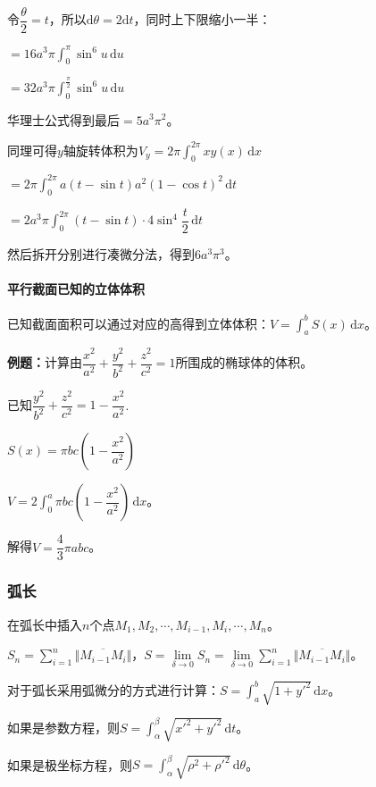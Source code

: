 \documentclass[UTF8, 12pt]{ctexart}
\begin{document}
令$\dfrac{\theta}{2}=t$，所以$\textrm{d}\theta=2\textrm{d}t$，同时上下限缩小一半：

$=16a^3\pi\int_0^\pi\sin^6u\,\textrm{d}u$

$=32a^3\pi\int_0^{\frac{\pi}{2}}\sin^6u\,\textrm{d}u$

华理士公式得到最后$=5a^3\pi^2$。

同理可得$y$轴旋转体积为$V_y=2\pi\int_0^{2\pi}xy(x)\,\textrm{d}x$

$=2\pi\int_0^{2\pi}a(t-\sin t)a^2(1-\cos t)^2\,\textrm{d}t$

$=2a^3\pi\int_0^{2\pi}(t-\sin t)\cdot 4\sin^4\dfrac{t}{2}\,\textrm{d}t$

然后拆开分别进行凑微分法，得到$6a^3\pi^3$。

\paragraph{平行截面已知的立体体积}  \leavevmode \medskip

已知截面面积可以通过对应的高得到立体体积：$V=\int_a^bS(x)\,\textrm{d}x$。

\textbf{例题：}计算由$\dfrac{x^2}{a^2}+\dfrac{y^2}{b^2}+\dfrac{z^2}{c^2}=1$所围成的椭球体的体积。

已知$\dfrac{y^2}{b^2}+\dfrac{z^2}{c^2}=1-\dfrac{x^2}{a^2}$.

$S(x)=\pi bc\left(1-\dfrac{x^2}{a^2}\right)$

$V=2\int_0^a\pi bc\left(1-\dfrac{x^2}{a^2}\right)\,\textrm{d}x$。

解得$V=\dfrac{4}{3}\pi abc$。

\subsubsection{弧长}

在弧长中插入$n$个点$M_1,M_2,\cdots,M_{i-1},M_i,\cdots,M_n$。

$S_n=\sum\limits_{i=1}^n\Vert\overline{M_{i-1}M_{i}}\Vert$，$S=\lim\limits_{\delta\to 0}S_n=\lim\limits_{\delta\to 0}\sum\limits_{i=1}^n\Vert\overline{M_{i-1}M_{i}}\Vert$。

对于弧长采用弧微分的方式进行计算：$S=\int_a^b\sqrt{1+y'^2}\,\textrm{d}x$。

如果是参数方程，则$S=\int_\alpha^\beta\sqrt{x'^2+y'^2}\,\textrm{d}t$。

如果是极坐标方程，则$S=\int_\alpha^\beta\sqrt{\rho^2+\rho'^2}\,\textrm{d}\theta$。
\end{document}
